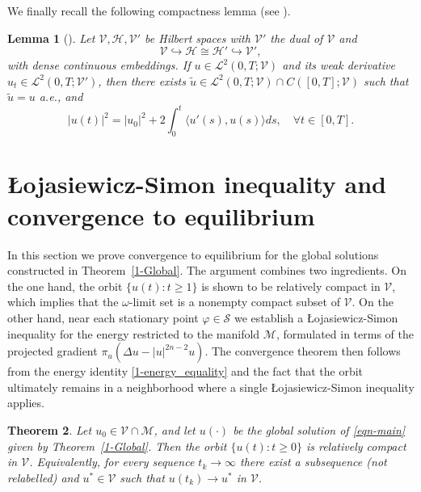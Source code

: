 \documentclass[10pt,a4paper]{amsart}
\numberwithin{equation}{section}
\newtheorem{theorem}{Theorem}[section]
\newtheorem{lemma}[theorem]{Lemma}
\begin{document}
We finally recall the following compactness lemma
(see \cite[Chapter~3, Lemma~1.2]{Temam}).

\begin{lemma}[{\cite[Lemma III 1.2]{Temam}}] \label{1-tem}
Let $\mathcal{V}, \mathcal{H}, \mathcal{V}'$ be Hilbert spaces with $\mathcal{V}'$
the dual of $\mathcal{V}$ and
\[
\mathcal{V} \hookrightarrow \mathcal{H} \cong \mathcal{H}'
\hookrightarrow \mathcal{V}',
\]
with dense continuous embeddings. If $u \in \mathcal{L}^{2}(0,T;\mathcal{V})$ and its
weak derivative $u_t \in \mathcal{L}^{2}(0,T;\mathcal{V}')$, then there exists
$\tilde{u} \in \mathcal{L}^{2}(0,T;\mathcal{V}) \cap C([0,T];\mathcal{V})$ such that
$\tilde{u} = u$ a.e., and
\[
| u(t) |^{2} = | u_{0} |^{2} + 2 \int_{0}^{t} \langle u'(s), u(s) \rangle  ds, \quad
\forall t \in [0,T].
\]
\end{lemma}

\section{\L{o}jasiewicz-Simon inequality and convergence to equilibrium}

In this section we prove convergence to equilibrium for the global solutions constructed
in Theorem~\ref{1-Global}. The argument combines two ingredients. On the one hand, the
orbit $\{u(t):t\ge 1\}$ is shown to be relatively compact in $\mathcal{V}$, which
implies that the $\omega$-limit set is a nonempty compact subset of $\mathcal{V}$.
On the other hand, near each stationary point $\varphi\in\mathcal{S}$ we establish
a \L{o}jasiewicz-Simon inequality for the energy restricted to the manifold
$\mathcal{M}$, formulated in terms of the projected gradient
$\pi_u(\Delta u-|u|^{2n-2}u)$. The convergence theorem then follows from the energy
identity \eqref{1-energy_equality} and the fact that the orbit ultimately remains in
a neighborhood where a single \L{o}jasiewicz-Simon inequality applies.


\begin{theorem}\label{thm:precompact}
Let $u_0\in \mathcal V\cap\mathcal M$, and let $u(\cdot)$ be the global solution of
\eqref{eqn-main} given by Theorem~\ref{1-Global}. Then the orbit $\{u(t): t\ge 0\}$
is relatively compact in $\mathcal V$. Equivalently, for every sequence $t_k\to\infty$
there exist a subsequence (not relabelled) and $u^\ast\in\mathcal V$ such that
$u(t_k)\to u^\ast$ in $\mathcal V$.
\end{theorem}
\end{document}
